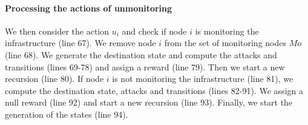 \paragraph{Processing the actions of unmonitoring}
We then consider the action $u_i$ and check if node $i$ is monitoring the infrastructure (line 67). 
We remove node $i$ from the set of monitoring nodes $Mo$ (line 68).
We generate the destination state and compute the attacks and transitions (lines 69-78) and assign a reward (line 79).
Then we start a new recursion (line 80).
If node $i$ is not monitoring the infrastructure (line 81), we compute the destination state, attacks and transitions (lines 82-91).
We assign a null reward (line 92) and start a new recursion (line 93).
Finally, we start the generation of the states (line 94).

\begin{algorithm}[htbp]
  \DontPrintSemicolon
  \LinesNumbered
\SetAlgoLined
\end{algorithm}
